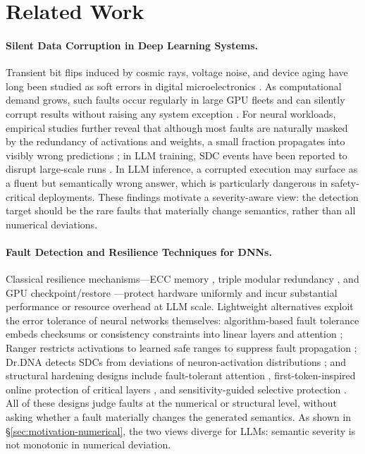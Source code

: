 \section{Related Work}
\label{sec:related}

\paragraph{Silent Data Corruption in Deep Learning Systems.}
Transient bit flips induced by cosmic rays, voltage noise, and device aging have long been studied as soft errors in digital microelectronics \cite{dodd2003basic}. As computational demand grows, such faults occur regularly in large GPU fleets and can silently corrupt results without raising any system exception \cite{wang2023understanding,wang2024understanding,he2023understanding,tan2025gerem}. For neural workloads, empirical studies further reveal that although most faults are naturally masked by the redundancy of activations and weights, a small fraction propagates into visibly wrong predictions \cite{xue2023soft,chen2025bit}; in LLM training, SDC events have been reported to disrupt large-scale runs \cite{ma2025understanding}. In LLM inference, a corrupted execution may surface as a fluent but semantically wrong answer, which is particularly dangerous in safety-critical deployments. These findings motivate a severity-aware view: the detection target should be the rare faults that materially change semantics, rather than all numerical deviations.

\paragraph{Fault Detection and Resilience Techniques for DNNs.}
Classical resilience mechanisms---ECC memory \cite{sullivan2023implicit}, triple modular redundancy \cite{mahmood2025design}, and GPU checkpoint/restore \cite{wei2025phoenixos,zeng2026gpu}---protect hardware uniformly and incur substantial performance or resource overhead at LLM scale. Lightweight alternatives exploit the error tolerance of neural networks themselves: algorithm-based fault tolerance embeds checksums or consistency constraints into linear layers and attention \cite{xue2023approxabft,liang2025attnchecker}; Ranger restricts activations to learned safe ranges to suppress fault propagation \cite{chen2021low}; Dr.DNA detects SDCs from deviations of neuron-activation distributions \cite{ma2024dr}; and structural hardening designs include fault-tolerant attention \cite{dai2025ft}, first-token-inspired online protection of critical layers \cite{sun2025ft2}, and sensitivity-guided selective protection \cite{xie2025realm}. All of these designs judge faults at the numerical or structural level, without asking whether a fault materially changes the generated semantics. As shown in \S\ref{sec:motivation-numerical}, the two views diverge for LLMs: semantic severity is not monotonic in numerical deviation.

